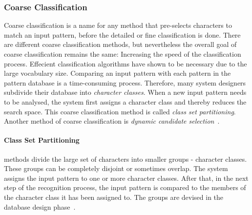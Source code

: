 \subsubsection{Coarse Classification}
\label{sec:olccr:coarseclassification}

Coarse classification is a name for any method that pre-selects characters
to match an input pattern, before the detailed or fine classification is done.
There are different coarse classification methods, but nevertheless the overall
goal of coarse classification remains the same: Increasing the speed of the
classification process.
Effecient classification algorithms have shown to be necessary due to the 
large vocabulary size. Comparing an input pattern with each pattern in the 
pattern database is a time-consuming process.
Therefore, many system designers subdivide their database into \emph{character
classes}. When a new input pattern needs to be analysed, the system first assigns
a character class and thereby reduces the search space. This coarse 
classification method is called \emph{class set partitioning}. Another method of 
coarse classification is \emph{dynamic candidate 
selection}~.

\paragraph{Class Set Partitioning} methods divide the large set of characters  
into smaller groups - character classes. These groups can be completely disjoint 
or sometimes overlap. The system assigns the input pattern to one or more 
character classes. After that, in the next step of the recognition process, 
the input pattern is compared to the members of the character class it has been 
assigned to. The groups are devised in the database design 
phase~.

